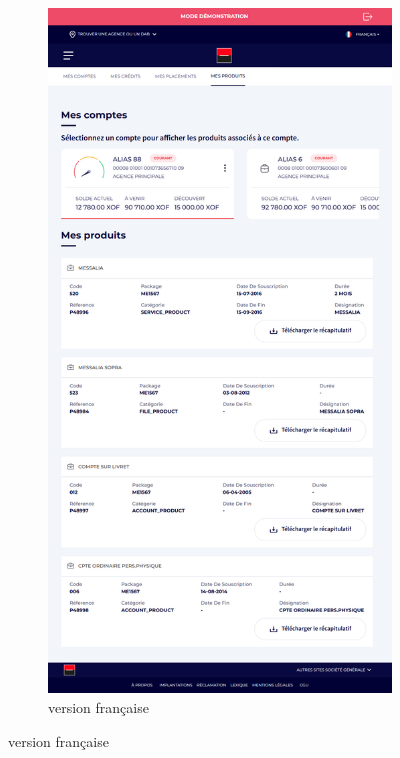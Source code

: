 \begin{figure}[!ht]
    \centering
    \begin{subfigure}[b]{0.49\textwidth}
        \centering
        \includegraphics[width=\textwidth]{images/screens/produits/tablette.png}
        \caption{version française}

\end{subfigure}
\end{figure}
